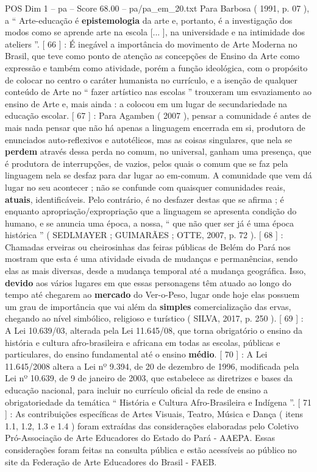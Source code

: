\begin{textsample}{POS Dim 1 – pa – Score 68.00 – pa/pa\_em\_20.txt}
Para Barbosa ( 1991, p. 07 ), a “ Arte-educação é \textbf{epistemologia} da arte e, portanto, é a investigação dos modos como se aprende arte na escola [... ], na universidade e na intimidade dos ateliers ”. [ 66 ] : É inegável a importância do movimento de Arte Moderna no Brasil, que teve como ponto de atenção as concepções de Ensino da Arte como expressão e também como atividade, porém a função ideológica, com o propósito de colocar no centro o caráter humanista no currículo, e a isenção de qualquer conteúdo de Arte no “ fazer artístico nas escolas ” trouxeram um esvaziamento ao ensino de Arte e, mais ainda : a colocou em um lugar de secundariedade na educação escolar. [ 67 ] : Para Agamben ( 2007 ), pensar a comunidade é antes de mais nada pensar que não há apenas a linguagem encerrada em si, produtora de enunciados auto-reflexivos e autotélicos, mas as coisas singulares, que nela se \textbf{perdem} através dessa perda no comum, no universal, ganham uma presença, que é produtora de interrupções, de vazios, pelos quais o comum que se faz pela linguagem nela se desfaz para dar lugar ao em-comum.
A comunidade que vem dá lugar no seu acontecer ; não se confunde com quaisquer comunidades reais, \textbf{atuais}, identificáveis.
Pelo contrário, é no desfazer destas que se afirma ; é enquanto apropriação/expropriação que a linguagem se apresenta condição do humano, e se anuncia uma época, a nossa, “ que não quer ser já é uma época histórica ” ( SEDLMAYER ; GUIMARÃES ; OTTE, 2007, p. 72 ). [ 68 ] : Chamadas erveiras ou cheirosinhas das feiras públicas de Belém do Pará nos mostram que esta é uma atividade eivada de mudanças e permanências, sendo elas as mais diversas, desde a mudança temporal até a mudança geográfica.
Isso, \textbf{devido} aos vários lugares em que essas personagens têm atuado ao longo do tempo até chegarem ao \textbf{mercado} do Ver-o-Peso, lugar onde hoje elas possuem um grau de importância que vai além da \textbf{simples} comercialização das ervas, chegando ao nível simbólico, religioso e turístico ( SILVA, 2017, p. 250 ). [ 69 ] : A Lei 10.639/03, alterada pela Lei 11.645/08, que torna obrigatório o ensino da história e cultura afro-brasileira e africana em todas as escolas, públicas e particulares, do ensino fundamental até o ensino \textbf{médio}. [ 70 ] : A Lei 11.645/2008 altera a Lei nº 9.394, de 20 de dezembro de 1996, modificada pela Lei nº 10.639, de 9 de janeiro de 2003, que estabelece as diretrizes e bases da educação nacional, para incluir no currículo oficial da rede de ensino a obrigatoriedade da temática “ História e Cultura Afro-Brasileira e Indígena ”. [ 71 ] : As contribuições específicas de Artes Visuais, Teatro, Música e Dança ( itens 1.1, 1.2, 1.3 e 1.4 ) foram extraídas das considerações elaboradas pelo Coletivo Pró-Associação de Arte Educadores do Estado do Pará - AAEPA.
Essas considerações foram feitas na consulta pública e estão acessíveis ao público no site da Federação de Arte Educadores do Brasil - FAEB.


\end{textsample}

